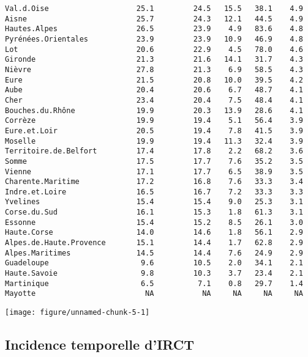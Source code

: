 \documentclass[11pt,a4paper]{article}\usepackage[]{graphicx}\usepackage[]{color}
\makeatletter
\def\maxwidth{ %
  \ifdim\Gin@nat@width>\linewidth
    \linewidth
  \else
    \Gin@nat@width
  \fi
}
\newenvironment{kframe}{%
 \def\at@end@of@kframe{}%
 \ifinner\ifhmode%
  \def\at@end@of@kframe{\end{minipage}}%
  \begin{minipage}{\columnwidth}%
 \fi\fi%
 \def\FrameCommand##1{\hskip\@totalleftmargin \hskip-\fboxsep
 \colorbox{shadecolor}{##1}\hskip-\fboxsep
     \hskip-\linewidth \hskip-\@totalleftmargin \hskip\columnwidth}%
 \MakeFramed {\advance\hsize-\width
   \@totalleftmargin\z@ \linewidth\hsize
   \@setminipage}}%
 {\par\unskip\endMakeFramed%
 \at@end@of@kframe}
\newenvironment{knitrout}{}{} %
\makeatother
\begin{document}
\begin{knitrout}
\begin{kframe}
\begin{verbatim}
Val.d.Oise                    25.1         24.5   15.5   38.1    4.9
Aisne                         25.7         24.3   12.1   44.5    4.9
Hautes.Alpes                  26.5         23.9    4.9   83.6    4.8
Pyrénées.Orientales           23.9         23.9   10.9   46.9    4.8
Lot                           20.6         22.9    4.5   78.0    4.6
Gironde                       21.3         21.6   14.1   31.7    4.3
Nièvre                        27.8         21.3    6.9   58.5    4.3
Eure                          21.5         20.8   10.0   39.5    4.2
Aube                          20.4         20.6    6.7   48.7    4.1
Cher                          23.4         20.4    7.5   48.4    4.1
Bouches.du.Rhône              19.9         20.3   13.9   28.6    4.1
Corrèze                       19.9         19.4    5.1   56.4    3.9
Eure.et.Loir                  20.5         19.4    7.8   41.5    3.9
Moselle                       19.9         19.4   11.3   32.4    3.9
Territoire.de.Belfort         17.4         17.8    2.2   68.2    3.6
Somme                         17.5         17.7    7.6   35.2    3.5
Vienne                        17.1         17.7    6.5   38.9    3.5
Charente.Maritime             17.2         16.8    7.6   33.3    3.4
Indre.et.Loire                16.5         16.7    7.2   33.3    3.3
Yvelines                      15.4         15.4    9.0   25.3    3.1
Corse.du.Sud                  16.1         15.3    1.8   61.3    3.1
Essonne                       15.4         15.2    8.5   26.1    3.0
Haute.Corse                   14.0         14.6    1.8   56.1    2.9
Alpes.de.Haute.Provence       15.1         14.4    1.7   62.8    2.9
Alpes.Maritimes               14.5         14.4    7.6   24.9    2.9
Guadeloupe                     9.6         10.5    2.0   34.1    2.1
Haute.Savoie                   9.8         10.3    3.7   23.4    2.1
Martinique                     6.5          7.1    0.8   29.7    1.4
Mayotte                         NA           NA     NA     NA     NA
\end{verbatim}
\end{kframe}
\end{knitrout}


\begin{knitrout}
\color{fgcolor}
\texttt{[image: figure/unnamed-chunk-5-1]} 

\end{knitrout}

  \subsection{Incidence temporelle d'IRCT}
\end{document}
